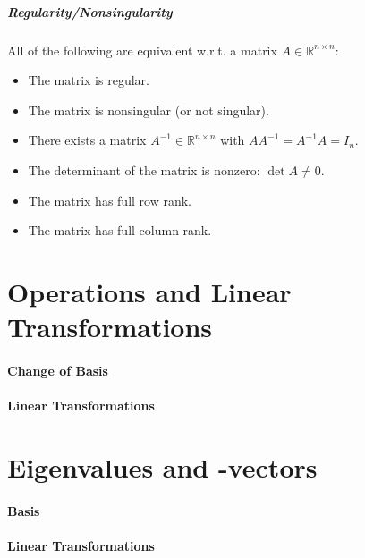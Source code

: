 \documentclass[a4paper, 11pt, accentcolor = tud3b]{tudreport}
\newcommand{\R}{\ensuremath{\mathbb{R}}}
\begin{document}
				\subparagraph{Regularity/Nonsingularity}
					All of the following are equivalent w.r.t. a matrix \( A \in \R^{n \times n} \):
					\begin{itemize}
						\item The matrix is regular.
						\item The matrix is nonsingular (or not singular).
						\item There exists a matrix \( A^{-1} \in \R^{n \times n} \) with \( AA^{-1} = A^{-1}A = I_n \).
						\item The determinant of the matrix is nonzero: \( \det A \neq 0 \).
						\item The matrix has full row rank.
						\item The matrix has full column rank.
					\end{itemize}

		\section{Operations and Linear Transformations} %

			\paragraph{Change of Basis} %

			\paragraph{Linear Transformations} %

		\section{Eigenvalues and -vectors} %

			\paragraph{Basis} %

			\paragraph{Linear Transformations} %
		
\end{document}
